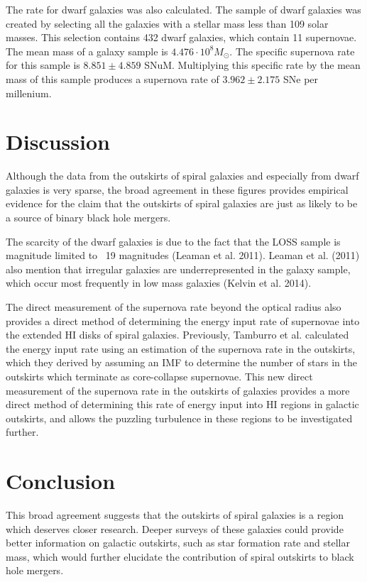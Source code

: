\documentclass[apj]{emulateapj}
\begin{document}
The rate for dwarf galaxies was also calculated. The sample of dwarf galaxies was created by selecting all the galaxies with a stellar mass less than 109 solar masses. This selection contains 432 dwarf galaxies, which contain 11 supernovae. The mean mass of a galaxy sample is $4.476 \cdot 10^{8} M_{\odot}$. The specific supernova rate for this sample is $8.851 \pm 4.859$ SNuM. Multiplying this specific rate by the mean mass of this sample produces a supernova rate of $3.962 \pm 2.175$ SNe per millenium.

\section{Discussion}

Although the data from the outskirts of spiral galaxies and especially from dwarf galaxies is very sparse, the broad agreement in these figures provides empirical evidence for the claim that the outskirts of spiral galaxies are just as likely to be a source of binary black hole mergers.

The scarcity of the dwarf galaxies is due to the fact that the LOSS sample is magnitude limited to ~19 magnitudes (Leaman et al. 2011). Leaman et al. (2011) also mention that irregular galaxies are underrepresented in the galaxy sample, which occur most frequently in low mass galaxies (Kelvin et al. 2014).

The direct measurement of the supernova rate beyond the optical radius also provides a direct method of determining the energy input rate of supernovae into the extended HI disks of spiral galaxies. Previously, Tamburro et al. calculated the energy input rate using an estimation of the supernova rate in the outskirts, which they derived by assuming an IMF to determine the number of stars in the outskirts which terminate as core-collapse supernovae. This new direct measurement of the supernova rate in the outskirts of galaxies provides a more direct method of determining this rate of energy input into HI regions in galactic outskirts, and allows the puzzling turbulence in these regions to be investigated further.

\section{Conclusion}

This broad agreement suggests that the outskirts of spiral galaxies is a region which deserves closer research. Deeper surveys of these galaxies could provide better information on galactic outskirts, such as star formation rate and stellar mass, which would further elucidate the contribution of spiral outskirts to black hole mergers. 
\end{document}
